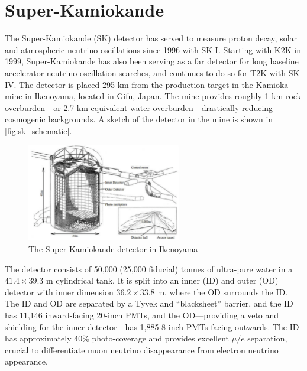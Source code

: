 \section{Super-Kamiokande}
\label{sec:sk}
The Super-Kamiokande (SK)\cite{t2k_sk, t2k_sk2, t2k_sk3} detector has served to measure proton decay, solar and atmospheric neutrino oscillations since 1996 with SK-I. Starting with K2K in 1999\cite{k2k_design}, Super-Kamiokande has also been serving as a far detector for long baseline accelerator neutrino oscillation searches, and continues to do so for T2K with SK-IV. The detector is placed 295 km from the production target in the Kamioka mine in Ikenoyama, located in Gifu, Japan. The mine provides roughly 1 km rock overburden---or 2.7 km equivalent water overburden---drastically reducing cosmogenic backgrounds. A sketch of the detector in the mine is shown in \autoref{fig:sk_schematic}.
\begin{figure}[h]
	\includegraphics[width=0.6\textwidth, trim={0mm 0mm 0mm 0mm}, clip,page=1]{figures/det_chap/sk/sk.pdf}
	\caption{The Super-Kamiokande detector in Ikenoyama}
	\label{fig:sk_schematic}
\end{figure}

The detector consists of 50,000 (25,000 fiducial) tonnes of ultra-pure water in a $41.4\times39.3\text{ m}$ cylindrical tank. It is split into an inner (ID) and outer (OD) detector with inner dimension $36.2\times33.8\text{ m}$, where the OD surrounds the ID. The ID and OD are separated by a Tyvek and ``blacksheet'' barrier, and the ID has 11,146 inward-facing 20-inch PMTs, and the OD---providing a veto and shielding for the inner detector---has 1,885 8-inch PMTs facing outwards. The ID has approximately 40\% photo-coverage and provides excellent $\mu/e$ separation, crucial to differentiate muon neutrino disappearance from electron neutrino appearance.

